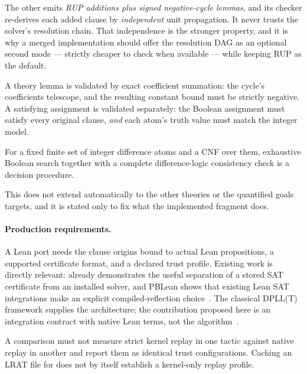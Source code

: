 The other emits \emph{RUP additions plus signed negative-cycle lemmas}, and its
checker re-derives each added clause by \emph{independent} unit propagation. It
never trusts the solver's resolution chain. That independence is the stronger
property, and it is why a merged implementation should offer the resolution DAG
as an optional second mode --- strictly cheaper to check when available --- while
keeping RUP as the default.

A theory lemma is validated by exact coefficient summation: the cycle's
coefficients telescope, and the resulting constant bound must be strictly
negative. A satisfying assignment is validated separately: the Boolean
assignment must satisfy every original clause, \emph{and} each atom's truth
value must match the integer model.

\begin{proposition}
For a fixed finite set of integer difference atoms and a CNF over them,
exhaustive Boolean search together with a complete difference-logic consistency
check is a decision procedure.
\end{proposition}

This does not extend automatically to the other theories or the quantified goals
\forge{} targets, and it is stated only to fix what the implemented fragment
does.

\paragraph{Production requirements.}
A Lean port needs the clause origins bound to actual Lean propositions, a
supported certificate format, and a declared trust profile. Existing work is
directly relevant:  already demonstrates the useful separation
of a stored SAT certificate from an installed solver, and PBLean shows that
existing Lean SAT integrations make an explicit compiled-reflection
choice~\cite{bv-decide-api,pblean}. The classical DPLL(T) framework supplies the
architecture; the contribution proposed here is an integration contract with
native Lean terms, not the algorithm~\cite{dpll-t}.

\begin{remark}
A comparison must not measure strict kernel replay in one tactic against native
replay in another and report them as identical trust configurations. Caching an
LRAT file for  does not by itself establish a kernel-only replay
profile.
\end{remark}

